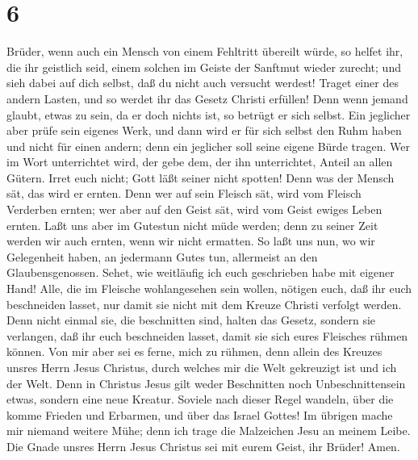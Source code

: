 \hypertarget{section-5}{%
\section{6}\label{section-5}}

 Brüder, wenn auch ein Mensch von einem Fehltritt übereilt
würde, so helfet ihr, die ihr geistlich seid, einem solchen im Geiste
der Sanftmut wieder zurecht; und sieh dabei auf dich selbst, daß du
nicht auch versucht werdest!  Traget einer des andern
Lasten, und so werdet ihr das Gesetz Christi erfüllen! 
Denn wenn jemand glaubt, etwas zu sein, da er doch nichts ist, so
betrügt er sich selbst.  Ein jeglicher aber prüfe sein
eigenes Werk, und dann wird er für sich selbst den Ruhm haben und nicht
für einen andern;  denn ein jeglicher soll seine eigene
Bürde tragen.  Wer im Wort unterrichtet wird, der gebe
dem, der ihn unterrichtet, Anteil an allen Gütern.  Irret
euch nicht; Gott läßt seiner nicht spotten! Denn was der Mensch sät, das
wird er ernten.  Denn wer auf sein Fleisch sät, wird vom
Fleisch Verderben ernten; wer aber auf den Geist sät, wird vom Geist
ewiges Leben ernten.  Laßt uns aber im Gutestun nicht müde
werden; denn zu seiner Zeit werden wir auch ernten, wenn wir nicht
ermatten.  So laßt uns nun, wo wir Gelegenheit haben, an
jedermann Gutes tun, allermeist an den Glaubensgenossen. 
Sehet, wie weitläufig ich euch geschrieben habe mit eigener Hand!
 Alle, die im Fleische wohlangesehen sein wollen, nötigen
euch, daß ihr euch beschneiden lasset, nur damit sie nicht mit dem
Kreuze Christi verfolgt werden.  Denn nicht einmal sie,
die beschnitten sind, halten das Gesetz, sondern sie verlangen, daß ihr
euch beschneiden lasset, damit sie sich eures Fleisches rühmen können.
 Von mir aber sei es ferne, mich zu rühmen, denn allein
des Kreuzes unsres Herrn Jesus Christus, durch welches mir die Welt
gekreuzigt ist und ich der Welt.  Denn in Christus Jesus
gilt weder Beschnitten noch Unbeschnittensein etwas, sondern eine neue
Kreatur.  Soviele nach dieser Regel wandeln, über die
komme Frieden und Erbarmen, und über das Israel Gottes! 
Im übrigen mache mir niemand weitere Mühe; denn ich trage die Malzeichen
Jesu an meinem Leibe.  Die Gnade unsres Herrn Jesus
Christus sei mit eurem Geist, ihr Brüder! Amen.
